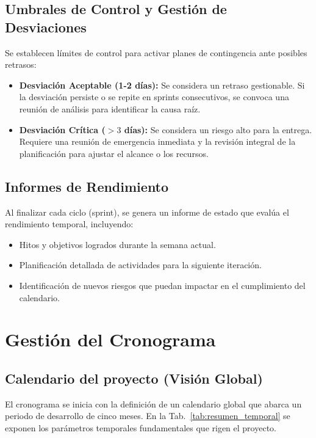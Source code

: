 \subsection{Umbrales de Control y Gestión de Desviaciones}
Se establecen límites de control para activar planes de contingencia ante posibles retrasos:
\begin{itemize}
    \item \textbf{Desviación Aceptable (1-2 días):} Se considera un retraso gestionable. Si la desviación persiste o se repite en sprints consecutivos, se convoca una reunión de análisis para identificar la causa raíz.
    \item \textbf{Desviación Crítica ($>3$ días):} Se considera un riesgo alto para la entrega. Requiere una reunión de emergencia inmediata y la revisión integral de la planificación para ajustar el alcance o los recursos.
\end{itemize}

\subsection{Informes de Rendimiento}
Al finalizar cada ciclo (sprint), se genera un informe de estado que evalúa el rendimiento temporal, incluyendo:
\begin{itemize}
    \item Hitos y objetivos logrados durante la semana actual.
    \item Planificación detallada de actividades para la siguiente iteración.
    \item Identificación de nuevos riesgos que puedan impactar en el cumplimiento del calendario.
\end{itemize}

\section{Gestión del Cronograma}

\subsection{Calendario del proyecto (Visión Global)}
El cronograma se inicia con la definición de un calendario global que abarca un periodo de desarrollo de cinco meses. En la Tab.~\ref{tab:resumen_temporal} se exponen los parámetros temporales fundamentales que rigen el proyecto.

